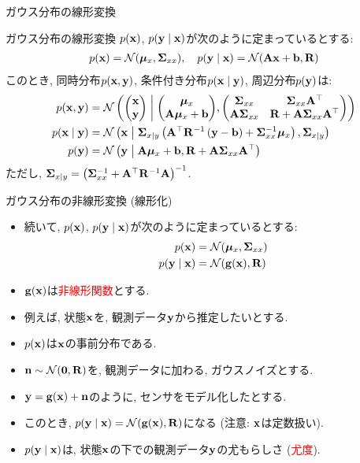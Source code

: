 \documentclass[dvipdfmx,notheorems,t]{beamer}
\begin{document}
\begin{frame}{ガウス分布の線形変換}
\begin{block}{ガウス分布の線形変換}
  $p(\vb{x})$, $p(\vb{y} \mid \vb{x})$が次のように定まっているとする:
  \begin{align*}
    p(\vb{x}) = \mathcal{N}(\vb*{\mu}_x, \vb{\Sigma}_{xx}), \quad
    p(\vb{y} \mid \vb{x}) = \mathcal{N}(\vb{A} \vb{x} + \vb{b}, \vb{R})
  \end{align*}
  このとき, 同時分布$p(\vb{x}, \vb{y})$, 条件付き分布$p(\vb{x} \mid \vb{y})$, 周辺分布$p(\vb{y})$は:
  \begin{align*}
    p(\vb{x}, \vb{y}) &= \mathcal{N} \left( \mqty(\vb{x} \\ \vb{y}) \middlerel|
      \mqty(\vb*{\mu}_x \\ \vb{A} \vb*{\mu}_x + \vb{b}),
      \mqty(\vb{\Sigma}_{xx} & \vb{\Sigma}_{xx} \vb{A}^\top \\
      \vb{A} \vb{\Sigma}_{xx} & \vb{R} + \vb{A} \vb{\Sigma}_{xx} \vb{A}^\top) \right) \\
    p(\vb{x} \mid \vb{y}) &= \mathcal{N} \left( \vb{x} \middlerel|
      \vb{\Sigma}_{x \mid y}
      \left( \vb{A}^\top \vb{R}^{-1} \left( \vb{y} - \vb{b} \right) + \vb{\Sigma}_{xx}^{-1} \vb*{\mu}_x \right),
      \vb{\Sigma}_{x \mid y} \right) \\
    p(\vb{y}) &= \mathcal{N} \left(\vb{y} \middlerel|
      \vb{A} \vb*{\mu}_x + \vb{b}, \vb{R} + \vb{A} \vb{\Sigma}_{xx} \vb{A}^\top \right)
  \end{align*}
  ただし, $\vb{\Sigma}_{x \mid y} = \left( \vb{\Sigma}_{xx}^{-1} + \vb{A}^\top \vb{R}^{-1} \vb{A} \right)^{-1}$.
\end{block}
\end{frame}

\begin{frame}{ガウス分布の非線形変換 (線形化)}
\begin{itemize}
  \item 続いて, $p(\vb{x})$, $p(\vb{y} \mid \vb{x})$が次のように定まっているとする:
  \begin{align*}
    p(\vb{x}) &= \mathcal{N}(\vb*{\mu}_x, \vb{\Sigma}_{xx}) \\
    p(\vb{y} \mid \vb{x}) &= \mathcal{N}(\vb{g}(\vb{x}), \vb{R})
  \end{align*}
  \item $\vb{g}(\vb{x})$は\textcolor{red}{非線形関数}とする.
  \item 例えば, 状態$\vb{x}$を, 観測データ$\vb{y}$から推定したいとする.
  \item $p(\vb{x})$は$\vb{x}$の事前分布である.
  \item $\vb{n} \sim \mathcal{N}(\vb{0}, \vb{R})$を, 観測データに加わる, ガウスノイズとする.
  \item $\vb{y} = \vb{g}(\vb{x}) + \vb{n}$のように, センサをモデル化したとする.
  \item このとき, $p(\vb{y} \mid \vb{x}) = \mathcal{N}(\vb{g}(\vb{x}), \vb{R})$になる
  (注意: $\vb{x}$は定数扱い).
  \item $p(\vb{y} \mid \vb{x})$は, 状態$\vb{x}$の下での観測データ$\vb{y}$の尤もらしさ (\textcolor{red}{尤度}).
\end{itemize}
\end{frame}
\end{document}
